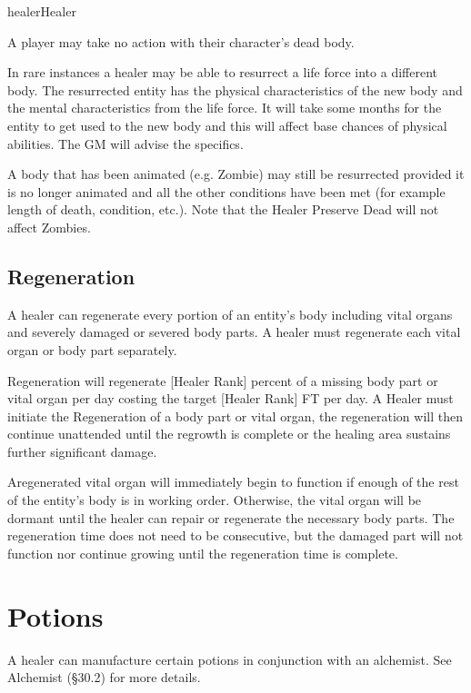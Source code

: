 \begin{Skill}[1.4]{healer}{Healer}
\begin{Itemize}
\item A player may take no action with their character’s dead body.

\item In rare instances a healer may be able to resurrect a life force
  into a different body.  The resurrected entity has the physical
  characteristics of the new body and the mental characteristics from
  the life force. It will take some months for the entity to get used
  to the new body and this will affect base chances of physical
  abilities.  The GM will advise the specifics.

\item A body that has been animated (e.g.  Zombie) may still be
  resurrected provided it is no longer animated and all the other
  conditions have been met (for example length of death, condition,
  etc.).  Note that the Healer Preserve Dead will not affect Zombies.
\end{Itemize}

\subsection{Regeneration}

A healer can regenerate every portion of an entity’s body including
vital organs and severely damaged or severed body parts.  A healer
must regenerate each vital organ or body part separately.

Regeneration will regenerate [Healer Rank] percent of a missing body
part or vital organ per day costing the target [Healer Rank] FT per
day.  A Healer must initiate the Regeneration of a body part or vital
organ, the regeneration will then continue unattended until the
regrowth is complete or the healing area sustains further significant
damage.

Aregenerated vital organ will immediately begin to function if enough
of the rest of the entity’s body is in working order.  Otherwise, the
vital organ will be dormant until the healer can repair or regenerate
the necessary body parts. The regeneration time does not need to be
consecutive, but the damaged part will not function nor continue
growing until the regeneration time is complete.

\section{Potions}

A healer can manufacture certain potions in conjunction with an
alchemist.  See Alchemist (§30.2) for more details.


\end{Skill}
